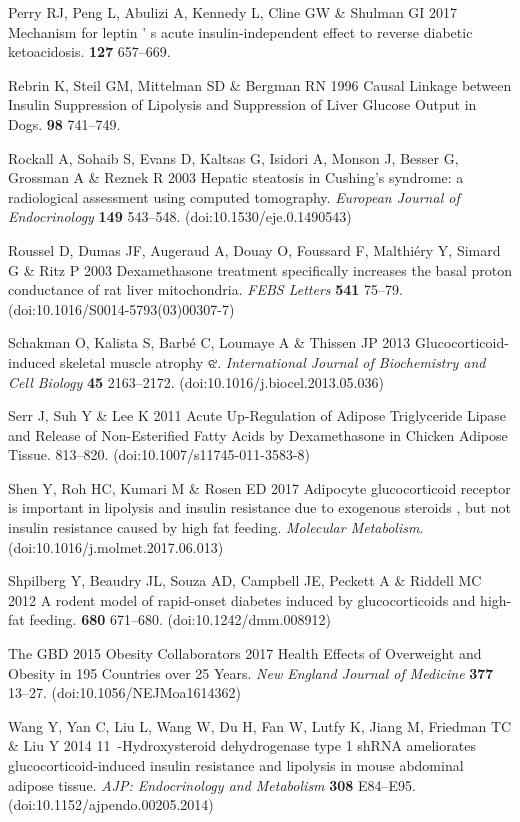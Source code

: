 \documentclass[11pt]{article} %
\begin{document}
Perry RJ, Peng L, Abulizi A, Kennedy L, Cline GW \& Shulman GI 2017
Mechanism for leptin ' s acute insulin-independent effect to reverse
diabetic ketoacidosis. \textbf{127} 657--669.

Rebrin K, Steil GM, Mittelman SD \& Bergman RN 1996 Causal Linkage
between Insulin Suppression of Lipolysis and Suppression of Liver
Glucose Output in Dogs. \textbf{98} 741--749.

Rockall A, Sohaib S, Evans D, Kaltsas G, Isidori A, Monson J, Besser G,
Grossman A \& Reznek R 2003 Hepatic steatosis in Cushing's syndrome: a
radiological assessment using computed tomography. \emph{European
Journal of Endocrinology} \textbf{149} 543--548.
(doi:10.1530/eje.0.1490543)

Roussel D, Dumas JF, Augeraud A, Douay O, Foussard F, Malthiéry Y,
Simard G \& Ritz P 2003 Dexamethasone treatment specifically increases
the basal proton conductance of rat liver mitochondria. \emph{FEBS
Letters} \textbf{541} 75--79. (doi:10.1016/S0014-5793(03)00307-7)

Schakman O, Kalista S, Barbé C, Loumaye A \& Thissen JP 2013
Glucocorticoid-induced skeletal muscle atrophy ଝ. \emph{International
Journal of Biochemistry and Cell Biology} \textbf{45} 2163--2172.
(doi:10.1016/j.biocel.2013.05.036)

Serr J, Suh Y \& Lee K 2011 Acute Up-Regulation of Adipose Triglyceride
Lipase and Release of Non-Esterified Fatty Acids by Dexamethasone in
Chicken Adipose Tissue. 813--820. (doi:10.1007/s11745-011-3583-8)

Shen Y, Roh HC, Kumari M \& Rosen ED 2017 Adipocyte glucocorticoid
receptor is important in lipolysis and insulin resistance due to
exogenous steroids , but not insulin resistance caused by high fat
feeding. \emph{Molecular Metabolism}. (doi:10.1016/j.molmet.2017.06.013)

Shpilberg Y, Beaudry JL, Souza AD, Campbell JE, Peckett A \& Riddell MC
2012 A rodent model of rapid-onset diabetes induced by glucocorticoids
and high-fat feeding. \textbf{680} 671--680. (doi:10.1242/dmm.008912)

The GBD 2015 Obesity Collaborators 2017 Health Effects of Overweight and
Obesity in 195 Countries over 25 Years. \emph{New England Journal of
Medicine} \textbf{377} 13--27. (doi:10.1056/NEJMoa1614362)

Wang Y, Yan C, Liu L, Wang W, Du H, Fan W, Lutfy K, Jiang M, Friedman TC
\& Liu Y 2014 11~-Hydroxysteroid dehydrogenase type 1 shRNA ameliorates
glucocorticoid-induced insulin resistance and lipolysis in mouse
abdominal adipose tissue. \emph{AJP: Endocrinology and Metabolism}
\textbf{308} E84--E95. (doi:10.1152/ajpendo.00205.2014)
\end{document}
